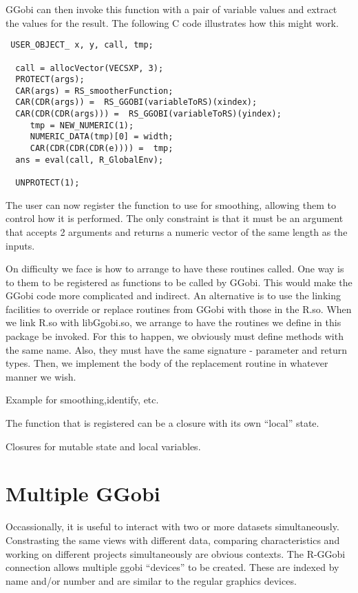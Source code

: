 GGobi can then invoke this function with a pair of variable values and
extract the values for the result.
The following C code illustrates how this might work.
\begin{verbatim}
 USER_OBJECT_ x, y, call, tmp;

  call = allocVector(VECSXP, 3);
  PROTECT(args);
  CAR(args) = RS_smootherFunction;
  CAR(CDR(args)) =  RS_GGOBI(variableToRS)(xindex);
  CAR(CDR(CDR(args))) =  RS_GGOBI(variableToRS)(yindex);
     tmp = NEW_NUMERIC(1);
     NUMERIC_DATA(tmp)[0] = width;
     CAR(CDR(CDR(CDR(e)))) =  tmp;
  ans = eval(call, R_GlobalEnv);

  UNPROTECT(1);
\end{verbatim}

The user can now register the function to use for smoothing, allowing
them to control how it is performed. The only constraint is that it
must be an argument that accepts 2 arguments and returns a numeric
vector of the same length as the inputs.



On difficulty we face is how to arrange to have these routines called.
One way is to them to be registered as functions to be called by
GGobi. This would make the GGobi code more complicated and indirect.
An alternative is to use the linking facilities to override or replace
routines from GGobi with those in the R.so.  When we link R.so with
libGgobi.so, we arrange to have the routines we define in this package
be invoked.  For this to happen, we obviously must define methods with
the same name. Also, they must have the same signature - parameter and
return types. Then, we implement the body of the replacement
routine in whatever manner we wish.



Example for smoothing,identify, etc.


The function that is registered can be a closure
with its own ``local'' state.

Closures for mutable state and local variables.



\section{Multiple GGobi}
Occassionally, it is useful to interact with two or more datasets
simultaneously. Constrasting the same views with different data,
comparing characteristics and working on different projects
simultaneously are obvious contexts. The R-GGobi connection allows
multiple ggobi ``devices'' to be created.  These are indexed by name
and/or number and are similar to the regular graphics devices.



